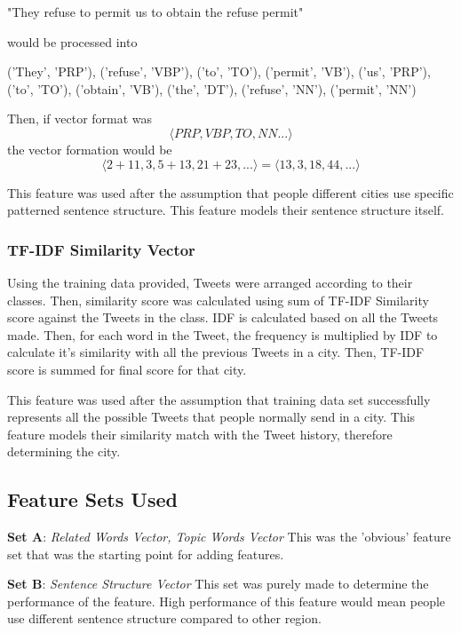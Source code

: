 \documentclass[11pt]{article}
\begin{document}
"They refuse to permit us to obtain the refuse permit"\newline

would be processed into\newline

('They', 'PRP'), ('refuse', 'VBP'), ('to', 'TO'), ('permit', 'VB'), ('us', 'PRP'),
('to', 'TO'), ('obtain', 'VB'), ('the', 'DT'), ('refuse', 'NN'), ('permit', 'NN')\newline

Then, if vector format was
\[
\langle PRP, VBP, TO, NN ...\rangle
\]
the vector formation would be
\[
\langle 2 + 11, 3, 5 + 13, 21 + 23, ...\rangle = \langle 13, 3, 18, 44, ...\rangle
\]

This feature was used after the assumption that people different cities use specific patterned sentence structure. This feature models their sentence structure itself.

\subsubsection{TF-IDF Similarity Vector}
Using the training data provided, Tweets were arranged according to their classes. Then, similarity score was calculated using sum of TF-IDF Similarity score against the Tweets in the class. IDF is calculated based on all the Tweets made. Then, for each word in the Tweet, the frequency is multiplied by IDF to calculate it's similarity with all the previous Tweets in a city. Then, TF-IDF score is summed for final score for that city.\newline

This feature was used after the assumption that training data set successfully represents all the possible Tweets that people normally send in a city. This feature models their similarity match with the Tweet history, therefore determining the city.

\subsection{Feature Sets Used}
\textbf{Set A}:
\textit{Related Words Vector, Topic Words Vector}
\newline
This was the 'obvious' feature set that was the starting point for adding features.
\newline

\textbf{Set B}:
\textit{Sentence Structure Vector}
\newline
This set was purely made to determine the performance of the feature. High performance of this feature would mean people use different sentence structure compared to other region.
\newline
\end{document}
